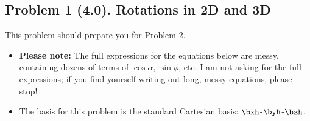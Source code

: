 \documentclass[11pt,titlepage,fleqn]{article}
\newcommand{\rotangA}{\alpha}
\begin{document}
\pagebreak
\subsection*{Problem 1 (4.0). Rotations in 2D and 3D}

This problem should prepare you for Problem 2.
%
\begin{itemize}
\item {\bf Please note:} The full expressions for the equations below are messy, containing dozens of terms of $\cos\rotangA$, $\sin\phi$, etc. I am not asking for the full expressions; if you find yourself writing out long, messy equations, please stop!
\item The basis for this problem is the standard Cartesian basis: $\bxh$-$\byh$-$\bzh$.
\end{itemize}

\end{document}
